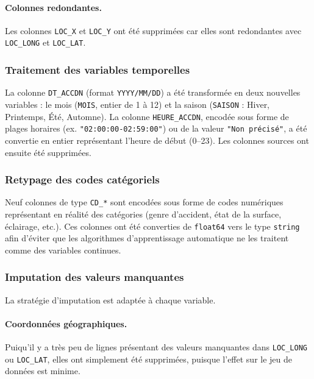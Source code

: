 \documentclass[12pt]{article}
\begin{document}
\paragraph{Colonnes redondantes.}
Les colonnes \texttt{LOC\_X} et \texttt{LOC\_Y} ont été supprimées
car elles sont redondantes avec \texttt{LOC\_LONG} et \texttt{LOC\_LAT}.
 
\subsubsection{Traitement des variables temporelles}
 
La colonne \texttt{DT\_ACCDN} (format \texttt{YYYY/MM/DD}) a été
transformée en deux nouvelles variables : le mois (\texttt{MOIS},
entier de 1 à 12) et la saison (\texttt{SAISON} : Hiver, Printemps,
Été, Automne). La colonne \texttt{HEURE\_ACCDN}, encodée sous forme
de plages horaires (ex. \texttt{"02:00:00-02:59:00"}) ou de la valeur
\texttt{"Non précisé"}, a été convertie en entier représentant
l'heure de début (0--23). Les colonnes sources ont ensuite été supprimées.
 
\subsubsection{Retypage des codes catégoriels}
 
Neuf colonnes de type \texttt{CD\_*} sont encodées sous forme de codes
numériques représentant en réalité des catégories (genre d'accident,
état de la surface, éclairage, etc.). Ces colonnes ont été converties
de \texttt{float64} vers le type \texttt{string} afin d'éviter que les
algorithmes d'apprentissage automatique ne les traitent comme des
variables continues.
 
\subsubsection{Imputation des valeurs manquantes}
 
La stratégie d'imputation est adaptée à chaque variable.
 
\paragraph{Coordonnées géographiques.}
Puiqu'il y a très peu de lignes présentant des valeurs manquantes dans
\texttt{LOC\_LONG} ou \texttt{LOC\_LAT}, elles ont simplement été supprimées, puisque l'effet sur le jeu de données est minime.
 
\end{document}
